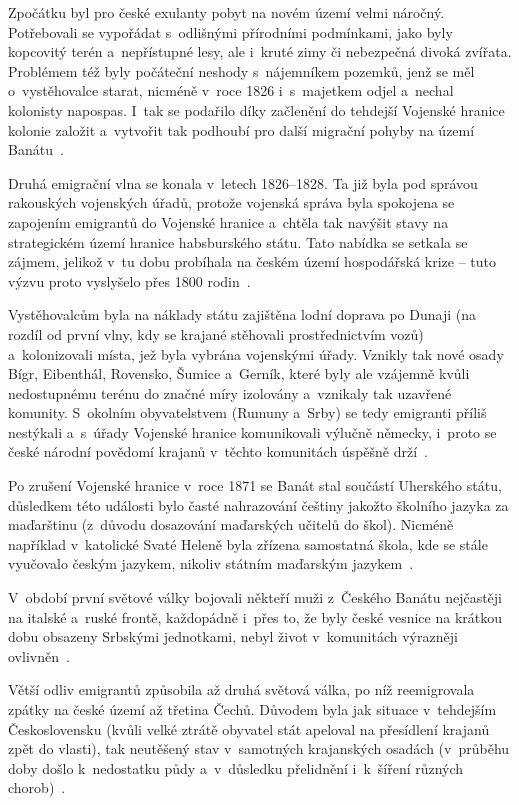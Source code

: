 Zpočátku byl pro české exulanty pobyt na novém území velmi náročný. Potřebovali se vypořádat s~odlišnými přírodními podmínkami, jako byly kopcovitý terén a~nepřístupné lesy, ale i~kruté zimy či nebezpečná divoká zvířata. Problémem též byly počáteční neshody s~nájemníkem pozemků, jenž se měl o~vystěhovalce starat, nicméně v~roce 1826 i~s~majetkem odjel a~nechal kolonisty napospas. I~tak se podařilo díky začlenění do tehdejší Vojenské hranice kolonie založit a~vytvořit tak podhoubí pro další migrační pohyby na území Banátu~\parencite{Secka1995}.

Druhá emigrační vlna se konala v~letech 1826--1828. Ta již byla pod správou rakouských vojenských úřadů, protože vojenská správa byla spokojena se zapojením emigrantů do Vojenské hranice a~chtěla tak navýšit stavy na strategickém území hranice habsburského státu. Tato nabídka se setkala se zájmem, jelikož v~tu dobu probíhala na českém území hospodářská krize -- tuto výzvu proto vyslyšelo přes 1800 rodin~\parencite{Frnochova2012}.

Vystěhovalcům byla na náklady státu zajištěna lodní doprava po Dunaji (na rozdíl od první vlny, kdy se krajané stěhovali prostřednictvím vozů) a~kolonizovali místa, jež byla vybrána vojenskými úřady. Vznikly tak nové osady Bígr, Eibenthál, Rovensko, Šumice a~Gerník, které byly ale vzájemně kvůli nedostupnému terénu do značné míry izolovány a~vznikaly tak uzavřené komunity. S~okolním obyvatelstvem (Rumuny a~Srby) se tedy emigranti příliš nestýkali a~s~úřady Vojenské hranice komunikovali výlučně německy, i~proto se české národní povědomí krajanů v~těchto komunitách úspěšně drží~\parencite{Secka1995}.

Po zrušení Vojenské hranice v~roce 1871 se Banát stal součástí Uherského státu, důsledkem této události bylo časté nahrazování češtiny jakožto školního jazyka za maďarštinu (z~důvodu dosazování maďarských učitelů do škol). Nicméně například v~katolické Svaté Heleně byla zřízena samostatná škola, kde se stále vyučovalo českým jazykem, nikoliv státním maďarským jazykem~\parencite{Gecse2013}.

V~období první světové války bojovali někteří muži z~Českého Banátu nejčastěji na italské a~ruské frontě, každopádně i~přes to, že byly české vesnice na krátkou dobu obsazeny Srbskými jednotkami, nebyl život v~komunitách výrazněji ovlivněn~\parencite{Gecse2013}.

Větší odliv emigrantů způsobila až druhá světová válka, po níž reemigrovala zpátky na české území až třetina Čechů. Důvodem byla jak situace v~tehdejším Československu (kvůli velké ztrátě obyvatel stát apeloval na přesídlení krajanů zpět do vlasti), tak neutěšený stav v~samotných krajanských osadách (v~průběhu doby došlo k~nedostatku půdy a~v~důsledku přelidnění i~k~šíření různých chorob)~\parencite{Secka1995}.

